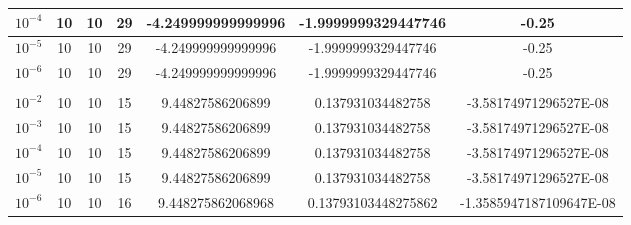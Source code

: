 \documentclass[12pt]{article}
\begin{document}
\begin{table}[H]
\begin{tabular}{|c|c|c|c|c|c|c|}
$10^{-4}$ & 10 & 10 & 29    & -4.249999999999996  & -1.9999999329447746 & -0.25                   \\ \hline
$10^{-5}$ & 10 & 10 & 29    & -4.249999999999996  & -1.9999999329447746 & -0.25                   \\ \hline
$10^{-6}$ & 10 & 10 & 29    & -4.249999999999996  & -1.9999999329447746 & -0.25                   \\ \hline
\rowcolor[HTML]{FFF0DB} 
\multicolumn{7}{|c|}{\cellcolor[HTML]{FFF0DB}$29x^2+18y^2-8x+10$}                                 \\ \hline
$10^{-2}$ & 10 & 10 & 15    & 9.44827586206899    & 0.137931034482758   & -3.58174971296527E-08   \\ \hline
$10^{-3}$ & 10 & 10 & 15    & 9.44827586206899    & 0.137931034482758   & -3.58174971296527E-08   \\ \hline
$10^{-4}$ & 10 & 10 & 15    & 9.44827586206899    & 0.137931034482758   & -3.58174971296527E-08   \\ \hline
$10^{-5}$ & 10 & 10 & 15    & 9.44827586206899    & 0.137931034482758   & -3.58174971296527E-08   \\ \hline
$10^{-6}$ & 10 & 10 & 16    & 9.448275862068968   & 0.13793103448275862 & -1.3585947187109647E-08 \\ \hline
\end{tabular}
\end{table}
\end{document}
